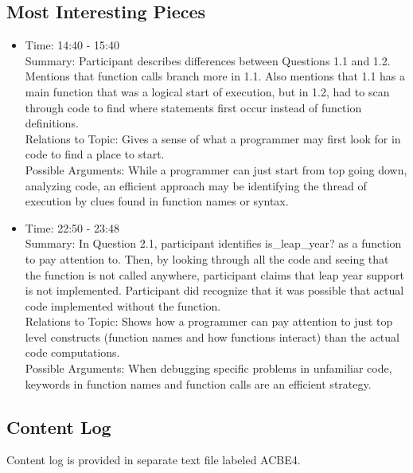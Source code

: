 \documentclass{article}
\begin{document}
\subsection{Most Interesting Pieces}
\begin{itemize}
  \item Time: 14:40 - 15:40 \\
  Summary:  Participant describes differences between Questions 1.1 and 1.2. Mentions that function calls branch more in 1.1. Also mentions that 1.1 has a main function that was a logical start of execution, but in 1.2, had to scan through code to find where statements first occur instead of function definitions. \\
  Relations to Topic: Gives a sense of what a programmer may first look for in code to find a place to start. \\
  Possible Arguments: While a programmer can just start from top going down, analyzing code, an efficient approach may be identifying the thread of execution by clues found in function names or syntax. 
  \item Time: 22:50 - 23:48 \\
  Summary: In Question 2.1, participant identifies is\_leap\_year? as a function to pay attention to. Then, by looking through all the code and seeing that the function is not called anywhere, participant claims that leap year support is not implemented. Participant did recognize that it was possible that actual code implemented without the function. \\
  Relations to Topic:  Shows how a programmer can pay attention to just top level constructs (function names and how functions interact) than the actual code computations. \\
  Possible Arguments: When debugging specific problems in unfamiliar code, keywords in function names and function calls are an efficient strategy.
\end{itemize}

\subsection{Content Log}
Content log is provided in separate text file labeled ACBE4.

\newpage
\end{document}
